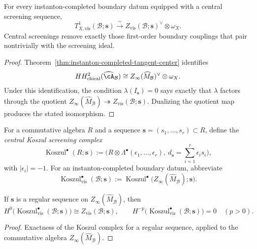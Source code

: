\begin{theorem}
\label{thm:screened-tangent-center}
For every instanton-completed boundary datum equipped with a central screening sequence,
\[
T^1_{X,\mathrm{vis}}(\mathcal B;\mathbf s)
\xrightarrow{\ \sim\ }
Z_{\mathrm{vis}}(\mathcal B;\mathbf s)^{\vee}\otimes \omega_X.
\]
Central screenings remove exactly those first-order boundary couplings that pair
nontrivially with the screening ideal.
\end{theorem}

\begin{proof}
Theorem~\ref{thm:instanton-completed-tangent-center} identifies
\[
HH^2_{\mathrm{chiral}}(\widehat{\cA}_{\mathcal B})
\cong Z_{\infty}(\widehat M_{\mathcal B})^{\vee}\otimes \omega_X.
\]
Under this identification, the condition $\lambda(I_{\mathbf s})=0$ says exactly that $\lambda$ factors through the quotient
$Z_{\infty}(\widehat M_{\mathcal B})\twoheadrightarrow Z_{\mathrm{vis}}(\mathcal B;\mathbf s)$. Dualizing the quotient map
produces the stated isomorphism.
\end{proof}

\begin{definition}
\label{def:central-koszul-screening-complex}
For a commutative algebra $R$ and a sequence $\mathbf s=(s_1,\dots,s_r)\subset R$, define the
\emph{central Koszul screening complex}
\[
\operatorname{Koszul}^{\bullet}(R;\mathbf s)
:=
\bigl(R\otimes \Lambda^{\bullet}(\epsilon_1,\dots,\epsilon_r),\ d_{\mathbf s}=\sum_{i=1}^r \epsilon_i s_i\bigr),
\]
with $|\epsilon_i|=-1$.
For an instanton-completed boundary datum, abbreviate
\[
\operatorname{Koszul}^{\bullet}_{\mathrm{vis}}(\mathcal B;\mathbf s)
:=
\operatorname{Koszul}^{\bullet}\bigl(Z_{\infty}(\widehat M_{\mathcal B});\mathbf s\bigr).
\]
\end{definition}

\begin{proposition}
\label{prop:koszul-identification-visible-center}
If $\mathbf s$ is a regular sequence on $Z_{\infty}(\widehat M_{\mathcal B})$, then
\[
H^0\bigl(\operatorname{Koszul}^{\bullet}_{\mathrm{vis}}(\mathcal B;\mathbf s)\bigr)
\cong Z_{\mathrm{vis}}(\mathcal B;\mathbf s),
\qquad
H^{-p}\bigl(\operatorname{Koszul}^{\bullet}_{\mathrm{vis}}(\mathcal B;\mathbf s)\bigr)=0\quad (p>0).
\]
\end{proposition}

\begin{proof}
Exactness of the Koszul complex for a regular sequence, applied to the commutative
algebra $Z_{\infty}(\widehat M_{\mathcal B})$.
\end{proof}

